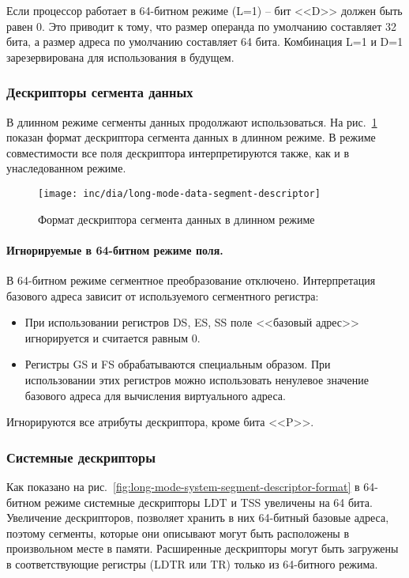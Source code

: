 Если процессор работает в 64-битном режиме (L=1) -- бит <<D>> должен быть равен 0. Это приводит к тому,
что размер операнда по умолчанию составляет 32 бита, а размер адреса по умолчанию составляет 64 бита.
Комбинация L=1 и D=1 зарезервирована для использования в будущем.

\subsubsection*{Дескрипторы сегмента данных}
В длинном режиме сегменты данных продолжают использоваться. На рис.~\ref{fig:long-mode-data-segment-descriptor-format}
показан формат дескриптора сегмента данных в длинном режиме. В режиме совместимости все поля дескриптора
интерпретируются также, как и в унаследованном режиме.

\begin{figure}[ht!]
  \centering
  \texttt{[image: inc/dia/long-mode-data-segment-descriptor]}
  \caption{Формат дескриптора сегмента данных в длинном режиме}
  \label{fig:long-mode-data-segment-descriptor-format}
\end{figure}

\paragraph{Игнорируемые в 64-битном режиме поля.}
В 64-битном режиме сегментное преобразование отключено. Интерпретация базового адреса зависит от
используемого сегментного регистра:
\begin{itemize}
\item При использовании регистров DS, ES, SS поле <<базовый адрес>> игнорируется и считается равным 0.
\item Регистры GS и FS обрабатываются специальным образом. При использовании этих регистров можно
	использовать ненулевое значение базового адреса для вычисления виртуального адреса.
\end{itemize}

Игнорируются все атрибуты дескриптора, кроме бита <<P>>.

\subsubsection*{Системные дескрипторы}
\label{subsec:system_desriptor_format}

Как показано на рис.~\ref{fig:long-mode-system-segment-descriptor-format} в 64-битном режиме
системные дескрипторы LDT и TSS увеличены на 64 бита. Увеличение дескрипторов, позволяет
хранить в них 64-битный базовые адреса, поэтому сегменты, которые они описывают могут быть
расположены в произвольном месте в памяти. Расширенные дескрипторы могут быть загружены в
соответствующие регистры (LDTR или TR) только из 64-битного режима.

